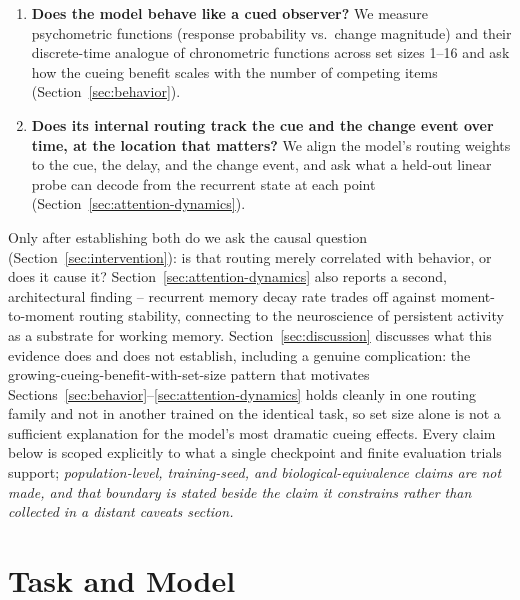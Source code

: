 \documentclass[10pt]{article}
\newcommand{\note}[1]{\textcolor{NoteGray}{\textit{#1}}}
\begin{document}
\begin{enumerate}
\item \textbf{Does the model behave like a cued observer?} We measure psychometric functions (response probability vs.\ change magnitude) and their discrete-time analogue of chronometric functions across set sizes 1--16 and ask how the cueing benefit scales with the number of competing items (Section~\ref{sec:behavior}).
\item \textbf{Does its internal routing track the cue and the change event over time, at the location that matters?} We align the model's routing weights to the cue, the delay, and the change event, and ask what a held-out linear probe can decode from the recurrent state at each point (Section~\ref{sec:attention-dynamics}).
\end{enumerate}

Only after establishing both do we ask the causal question (Section~\ref{sec:intervention}): is that routing merely correlated with behavior, or does it cause it? Section~\ref{sec:attention-dynamics} also reports a second, architectural finding -- recurrent memory decay rate trades off against moment-to-moment routing stability, connecting to the neuroscience of persistent activity as a substrate for working memory. Section~\ref{sec:discussion} discusses what this evidence does and does not establish, including a genuine complication: the growing-cueing-benefit-with-set-size pattern that motivates Sections~\ref{sec:behavior}--\ref{sec:attention-dynamics} holds cleanly in one routing family and not in another trained on the identical task, so set size alone is not a sufficient explanation for the model's most dramatic cueing effects. Every claim below is scoped explicitly to what a single checkpoint and finite evaluation trials support; \note{population-level, training-seed, and biological-equivalence claims are not made, and that boundary is stated beside the claim it constrains rather than collected in a distant caveats section.}

\FloatBarrier
\section{Task and Model}\label{sec:task-model}
\end{document}
